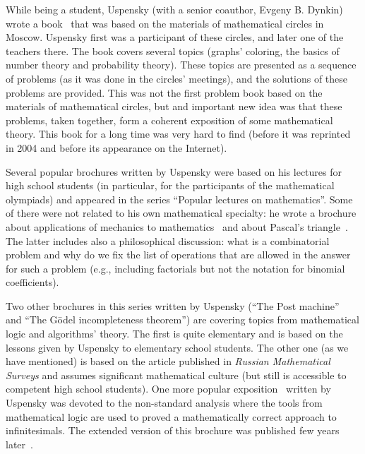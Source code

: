 \documentclass[12pt]{article}
\theoremstyle{remark}
\begin{document}
While being a student, Uspensky (with a senior coauthor, Evgeny B. Dynkin) wrote a book~\cite{1952}  that was based on the materials of mathematical circles in Moscow. Uspensky first was a participant of these circles, and later one of the teachers there. The book covers several topics (graphs' coloring, the basics of number theory and probability theory). These topics are presented as a sequence of problems (as it was done in the circles' meetings), and the solutions of these problems are provided. This was not the first problem book based on the materials of mathematical circles, but and important new idea was that these problems, taken together, form a coherent exposition of some mathematical theory. This book for a long time was very hard to find (before it was reprinted in 2004 and before its appearance on the Internet). 

Several popular brochures written by Uspensky were based on his lectures for high school students (in particular, for the participants of the mathematical olympiads) and appeared in the series ``Popular lectures on mathematics''. Some of there were not related to his own mathematical specialty: he wrote a brochure about applications of mechanics to mathematics~\cite{1958a} and about Pascal's triangle~\cite{1966}. The latter includes also a philosophical discussion: what is a combinatorial problem and why do we fix the list of operations that are allowed in the answer for such a problem  (e.g., including factorials but not the notation for binomial coefficients).

Two other brochures in this series written by Uspensky (``The Post machine''~\cite{1979} and ``The G\"{o}del incompleteness theorem'') are covering topics from mathematical logic and algorithms' theory. The first is quite elementary and is based on the lessons given by Uspensky to elementary school students. The other one (as we have mentioned) is based on the article published in \emph{Russian Mathematical Surveys} and assumes significant mathematical culture (but still is accessible to competent high school students). One more popular exposition~\cite{1983} written by Uspensky was devoted to the non-standard analysis where the tools from mathematical logic are used to proved a mathematically correct approach to infinitesimals. The extended version of this brochure was published few years later~\cite{1987}.
\end{document}
